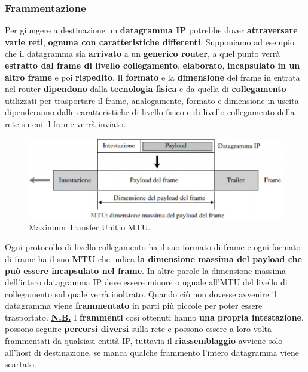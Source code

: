 \documentclass[11pt,a4paper,oneside]{book}
\theoremstyle{definition}
\begin{document}
\pagebreak

\subsubsection{Frammentazione}
Per giungere a destinazione un \textbf{datagramma IP} potrebbe dover \textbf{attraversare varie reti},\textbf{ ognuna con caratteristiche differenti}. Supponiamo ad esempio che il datagramma sia \textbf{arrivato} a un \textbf{generico router}, a quel punto verrà \textbf{estratto dal frame di livello collegamento}, \textbf{elaborato}, \textbf{incapsulato in un altro frame} e poi \textbf{rispedito}. Il \textbf{formato} e la \textbf{dimensione} del frame in entrata nel router \textbf{dipendono} dalla \textbf{tecnologia fisica} e da quella di \textbf{collegamento} utilizzati per trasportare il frame, analogamente, formato e dimensione in uscita dipenderanno dalle caratteristiche di livello fisico e di livello collegamento della rete su cui il frame verrà inviato.

\begin{figure}[!h]
	\includegraphics[scale=0.3]{Immagini/MTU.png}
	\centering
	\caption{Maximum Transfer Unit o MTU.}
\end{figure}

Ogni protocollo di livello collegamento ha il suo formato di frame e ogni formato di frame ha il suo \textbf{MTU} che indica \textbf{la dimensione massima del payload che può essere incapsulato nel frame}. In altre parole la dimensione massima dell'intero datagramma IP deve essere minore o uguale all'MTU del livello di collegamento sul quale verrà inoltrato. Quando ciò non dovesse avvenire il datagramma viene \textbf{frammentato} in parti più piccole per poter essere trasportato. \textbf{\underline{N.B.}} I \textbf{frammenti} così ottenuti hanno  \textbf{una propria intestazione}, possono seguire \textbf{percorsi diversi} sulla rete e possono essere a loro volta frammentati da qualsiasi entità IP, tuttavia il \textbf{riassemblaggio} avviene solo all'host di destinazione, se manca qualche frammento l'intero datagramma viene scartato.
\end{document}
